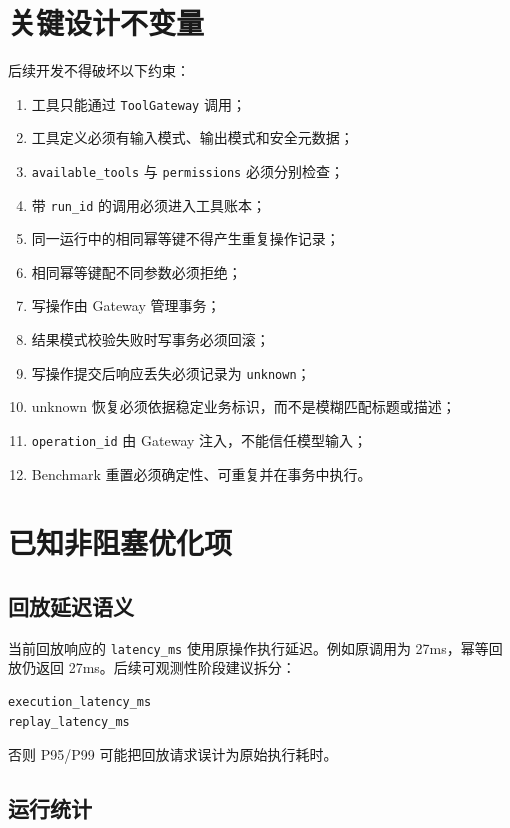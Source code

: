 \documentclass[11pt,a4paper]{ctexart}
\begin{document}
\section{关键设计不变量}

后续开发不得破坏以下约束：

\begin{enumerate}[leftmargin=2.2em]
  \item 工具只能通过 \texttt{ToolGateway} 调用；
  \item 工具定义必须有输入模式、输出模式和安全元数据；
  \item \texttt{available\_tools} 与 \texttt{permissions} 必须分别检查；
  \item 带 \texttt{run\_id} 的调用必须进入工具账本；
  \item 同一运行中的相同幂等键不得产生重复操作记录；
  \item 相同幂等键配不同参数必须拒绝；
  \item 写操作由 Gateway 管理事务；
  \item 结果模式校验失败时写事务必须回滚；
  \item 写操作提交后响应丢失必须记录为 \texttt{unknown}；
  \item unknown 恢复必须依据稳定业务标识，而不是模糊匹配标题或描述；
  \item \texttt{operation\_id} 由 Gateway 注入，不能信任模型输入；
  \item Benchmark 重置必须确定性、可重复并在事务中执行。
\end{enumerate}

\section{已知非阻塞优化项}

\subsection{回放延迟语义}

当前回放响应的 \texttt{latency\_ms} 使用原操作执行延迟。例如原调用为
27ms，幂等回放仍返回 27ms。后续可观测性阶段建议拆分：

\begin{lstlisting}
execution_latency_ms
replay_latency_ms
\end{lstlisting}

否则 P95/P99 可能把回放请求误计为原始执行耗时。

\subsection{运行统计}
\end{document}
